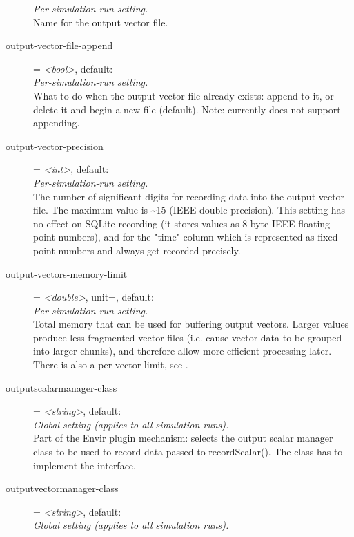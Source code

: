 \begin{description}
    \textit{Per-simulation-run setting.}\\
    Name for the output vector file.
\item[output-vector-file-append] = \textit{<bool>}, default: \\
    \textit{Per-simulation-run setting.}\\
    What to do when the output vector file already exists: append to it, or
    delete it and begin a new file (default). Note:
     currently does not support
    appending.
\item[output-vector-precision] = \textit{<int>}, default: \\
    \textit{Per-simulation-run setting.}\\
    The number of significant digits for recording data into the output vector
    file. The maximum value is {\textasciitilde}15 (IEEE double precision).
    This setting has no effect on SQLite recording (it stores values as 8-byte
    IEEE floating point numbers), and for the "time" column which is
    represented as fixed-point numbers and always get recorded precisely.
\item[output-vectors-memory-limit] = \textit{<double>}, unit=, default: \\
    \textit{Per-simulation-run setting.}\\
    Total memory that can be used for buffering output vectors. Larger values
    produce less fragmented vector files (i.e. cause vector data to be grouped
    into larger chunks), and therefore allow more efficient processing later.
    There is also a per-vector limit, see
    .
\item[outputscalarmanager-class] = \textit{<string>}, default: \\
    \textit{Global setting (applies to all simulation runs).}\\
    Part of the Envir plugin mechanism: selects the output scalar manager class
    to be used to record data passed to recordScalar(). The class has to
    implement the  interface.
\item[outputvectormanager-class] = \textit{<string>}, default: \\
    \textit{Global setting (applies to all simulation runs).}\\

\end{description}
